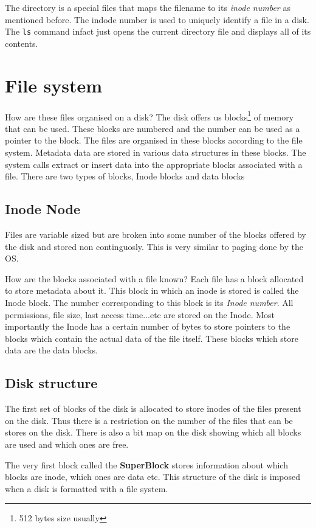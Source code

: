 \documentclass[12pt]{article}
\begin{document}
The directory is a special files that maps the filename to its \textit{inode number} as mentioned before. The indode number is used to uniquely identify a file in a disk. The \texttt{ls} command infact just opens the current directory file and displays all of its contents.

\section{File system}

How are these files organised on a disk?
The disk offers us blocks\footnote{512 bytes size usually} of memory that can be used. These blocks are numbered and the number can be used as a pointer to the block. The files are organised in these blocks according to the file system. Metadata data are stored in various data structures in these blocks. The system calls extract or insert data into the appropriate blocks associated with a file.
There are two types of blocks, Inode blocks and data blocks
\subsection{Inode Node}
Files are variable sized but are broken into some number of the blocks offered by the disk and stored non continguosly. This is very similar to paging done by the OS. 


How are the blocks associated with a file known? Each file has a block allocated to store metadata about it. This block in which an inode is stored is called the Inode block. The number corresponding to this block is its \textit{Inode number}. All permissions, file size, last access time...etc are stored on the Inode. Most importantly the 
Inode has a certain number of bytes to store pointers to the blocks which contain the actual data of the file itself. These blocks which store data are the data blocks. 


\subsection{Disk structure}
The first set of blocks of the disk is allocated to store inodes of the files present on the disk. Thus there is a restriction on the number of the files that can be stores on the disk.
There is also a bit map on the disk showing which all blocks are used and which ones are free. 

The very first block called the \textbf{SuperBlock} stores information about which blocks are inode, which ones are data etc. This structure of the disk is imposed when a disk is formatted with a file system. 
\end{document}

